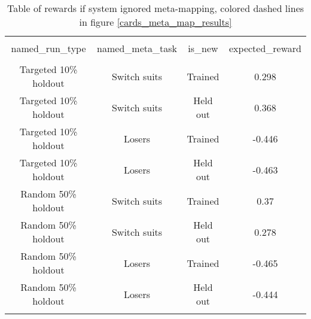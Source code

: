 \documentclass{article}
\begin{document}
\begin{table}[H]
\scriptsize
\centering
\begin{tabular}{@{\extracolsep{5pt}} cccc}
\\[-1.8ex]\hline
\hline \\[-1.8ex]
named\_run\_type & named\_meta\_task & is\_new & expected\_reward \\
\hline \\[-1.8ex]
Targeted 10\% holdout & Switch suits & Trained & 0.298 \\
Targeted 10\% holdout & Switch suits & Held out & 0.368 \\
Targeted 10\% holdout & Losers & Trained & -0.446 \\
Targeted 10\% holdout & Losers & Held out & -0.463 \\
Random 50\% holdout & Switch suits & Trained & 0.37 \\
Random 50\% holdout & Switch suits & Held out & 0.278 \\
Random 50\% holdout & Losers & Trained & -0.465 \\
Random 50\% holdout & Losers & Held out & -0.444 \\
\hline \\[-1.8ex]
\end{tabular}
\caption{Table of rewards if system ignored meta-mapping, colored dashed lines in figure \ref{cards_meta_map_results}}
\end{table}
\end{document}

